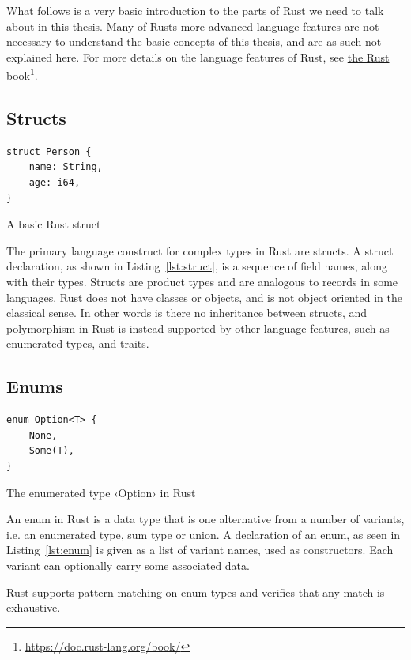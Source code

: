What follows is a very basic introduction to the parts of Rust we need to talk about in this thesis. Many of Rusts more advanced language features are not necessary to understand the basic concepts of this thesis, and are as such not explained here. For more details on the language features of Rust, see \href{https://doc.rust-lang.org/book/}{the Rust book}\footnote{\url{https://doc.rust-lang.org/book/}}.

\subsection{Structs}

\begin{listing}[ht!]
\begin{verbatim}
struct Person {
    name: String,
    age: i64,
}
\end{verbatim}
\caption{A basic Rust struct}
\label{lst:struct}
\end{listing}

The primary language construct for complex types in Rust are structs. A struct declaration, as shown in Listing~\ref{lst:struct}, is a sequence of field names, along with their types. Structs are product types and are analogous to records in some languages. Rust does not have classes or objects, and is not object oriented in the classical sense. In other words is there no inheritance between structs, and polymorphism in Rust is instead supported by other language features, such as enumerated types, and traits.

\subsection{Enums}

\begin{listing}[ht!]
\begin{verbatim}
enum Option<T> {
    None,
    Some(T),
}
\end{verbatim}
\caption{The enumerated type ‹Option› in Rust}
\label{lst:enum}
\end{listing}

An enum in Rust is a data type that is one alternative from a number of variants, i.e. an enumerated type, sum type or union. A declaration of an enum, as seen in Listing~\ref{lst:enum} is given as a list of variant names, used as constructors. Each variant can optionally carry some associated data.

Rust supports pattern matching on enum types and verifies that any match is exhaustive.

